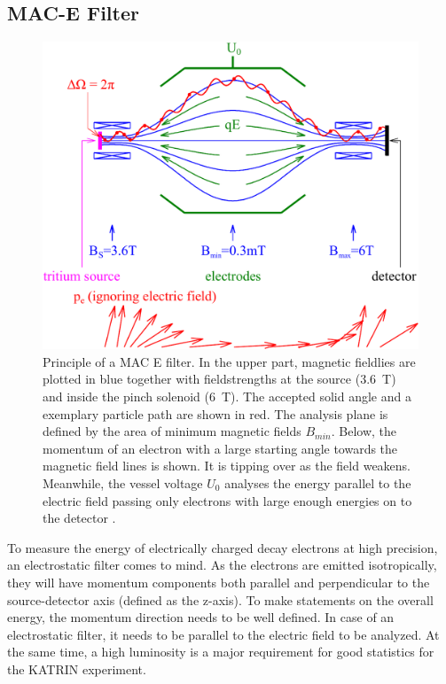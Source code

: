        \subsection{MAC-E Filter}
                   \begin{figure}
	\centering
      	\includegraphics[width = 0.8 \textwidth]{graphics/katrinExperiment/macEFilter.pdf}
      	\caption[MAC E Filter]{Principle of a MAC E filter. In the upper part, magnetic fieldlies are plotted in blue together with fieldstrengths at the source (\SI{3.6}{\tesla}) and inside the pinch solenoid (\SI{6}{\tesla}). The accepted solid angle and a exemplary particle path are shown in red. The analysis plane is defined by the area of minimum magnetic fields $B_{min}$. Below, the momentum of an electron with a large starting angle towards the magnetic field lines is shown. It is tipping over as the field weakens. Meanwhile, the vessel voltage $U_0$ analyses the energy parallel to the electric field passing only electrons with large enough energies on to the detector \cite{macEFilter}.}
      	\label{fig:katrinExperiment:macEFilter}
      \end{figure}
      \label{ch:The KATRIN experiment:sec:MAC-E}
		To measure the energy of electrically charged decay electrons at high precision, an electrostatic filter comes to mind. As the electrons are emitted isotropically, they will have momentum components both parallel and perpendicular to the source-detector axis (defined as the z-axis). To make statements on the overall energy, the momentum direction needs to be well defined. In case of an electrostatic filter, it needs to be parallel to the electric field to be analyzed.
		At the same time, a high luminosity is a major requirement for good statistics for the KATRIN experiment.
